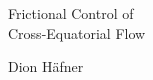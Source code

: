 \begingroup
{}
\vspace*{-3\onelineskip}
\begin{whole}
\raggedright\firalight\fontsize{38}{42}\selectfont Frictional Control of\\Cross-Equatorial Flow

\raggedright\firalight\fontsize{22}{30}\selectfont Dion Häfner
\end{whole}
\endgroup
\clearpage
